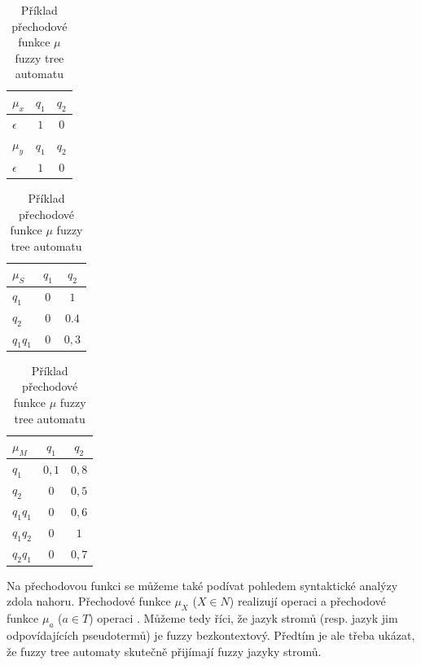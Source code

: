 \documentclass[a4paper,10pt]{article}
\begin{document}
\begin{table}
 \begin{subtable}[t]{0.3\textwidth}
  \begin{tabular}{|l||c|c|}
    \hline 
    $\mu_x$		& $q_1$	& $q_2$	\\
    \hline
    $\epsilon$		& $1$	& $0$	\\
    \hline \hline
  
    $\mu_y$		& $q_1$	& $q_2$	\\
    \hline
    $\epsilon$		& $1$	& $0$	\\
    \hline
  \end{tabular}
 \end{subtable}
%
  \begin{subtable}[t]{0.3\textwidth}
    \begin{tabular}{|l||c|c|}
      \hline 
      $\mu_S$		& $q_1$	& $q_2$	\\
      \hline
      $q_1$		& $0$	& $1$	\\
      $q_2$		& $0$	& $0.4$	\\
      $q_1 q_1$		& $0$	& $0,3$	\\  
      \hline
    \end{tabular}
  \end{subtable}
%
  \begin{subtable}[t]{0.3\textwidth}
    \begin{tabular}{|l||c|c|}
      \hline 
      $\mu_M$		& $q_1$	& $q_2$	\\
      \hline
      $q_1$		& $0,1$	& $0,8$	\\
      $q_2$		& $0$	& $0,5$	\\
      $q_1 q_1$		& $0$	& $0,6$	\\
      $q_1 q_2$		& $0$	& $1$	\\
      $q_2 q_1$		& $0$	& $0,7$	\\
      \hline 
    \end{tabular}
  \end{subtable}
  
  \caption{Příklad přechodové funkce $\mu$ fuzzy tree automatu} \label{tab:MuOfFuzTreAut}
\end{table}

Na přechodovou funkci se můžeme také podívat pohledem syntaktické analýzy zdola nahoru. Přechodové funkce $\mu_X$ ($X \in N$) realizují operaci  a přechodové funkce $\mu_a$ ($a \in T$) operaci . Můžeme tedy říci, že jazyk stromů (resp. jazyk jim odpovídajících pseudotermů) je fuzzy bezkontextový. Předtím je ale třeba ukázat, že fuzzy tree automaty skutečně přijímají fuzzy jazyky stromů.
\end{document}
